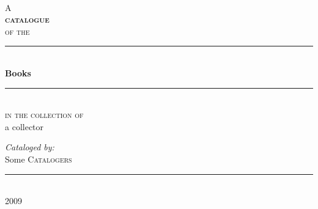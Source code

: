 \begin{titlepage}
 
\begin{center}
 
 
~\\[1cm]
{\small A}\\[0.5cm]

\textsc{\huge\bfseries catalogue}\\[0.5cm]
 
\textsc{\small of the}\\[0.5cm]
 
 
\rule{\linewidth}{0.5mm}\\[0.4cm]
{ \huge \bfseries Books}\\[0.4cm]

\rule{\linewidth}{0.5mm}\\[0.5cm]

\textsc{\small in the collection of}\\[0.5cm]

{\selectfont\LARGE a collector}\\[1.5cm]
 
\begin{flushleft} \large
\emph{Cataloged by:}\\
Some \textsc{Catalogers}\\
\end{flushleft}
 
\vfill
 
\rule{6cm}{0.25mm}\\[0.2cm]

{\large 2009}
 
\end{center}
 
\end{titlepage}

